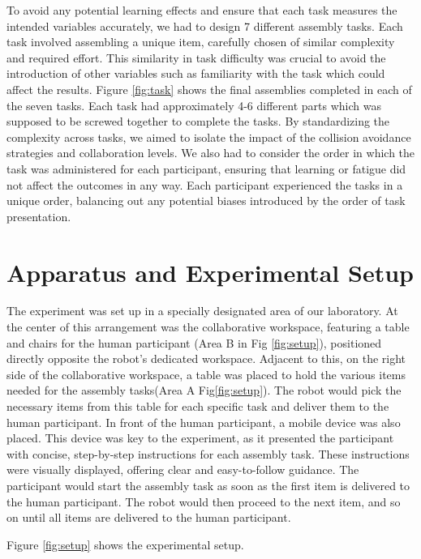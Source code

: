 To avoid any potential learning effects and ensure that each task measures the intended variables accurately, we had to design 7 different assembly tasks. Each task involved assembling a unique item, carefully chosen of similar complexity and required effort. This similarity in task difficulty was crucial to avoid the introduction of other variables such as familiarity with the task which could affect the results. Figure \ref{fig:task} shows the final assemblies completed in each of the seven tasks. Each task had approximately 4-6 different parts which was supposed to be screwed together to complete the tasks. By standardizing the complexity across tasks, we aimed to isolate the impact of the collision avoidance strategies and collaboration levels. We also had to consider the order in which the task was administered for each participant, ensuring that learning or fatigue did not affect the outcomes in any way. Each participant experienced the tasks in a unique order, balancing out any potential biases introduced by the order of task presentation. 


\section{Apparatus and Experimental Setup} 
The experiment was set up in a specially designated area of our laboratory. At the center of this arrangement was the collaborative workspace, featuring a table and chairs for the human participant (Area B in Fig \ref{fig:setup}), positioned directly opposite the robot's dedicated workspace. Adjacent to this, on the right side of the collaborative workspace, a table was placed to hold the various items needed for the assembly tasks(Area A Fig\ref{fig:setup}). The robot would pick the necessary items from this table for each specific task and deliver them to the human participant. In front of the human participant, a mobile device was also placed. This device was key to the experiment, as it presented the participant with concise, step-by-step instructions for each assembly task. These instructions were visually displayed, offering clear and easy-to-follow guidance. The participant would start the assembly task as soon as the first item is delivered to the human participant. The robot would then proceed to the next item, and so on until all items are delivered to the human participant.

Figure \ref{fig:setup} shows the experimental setup. 

 

